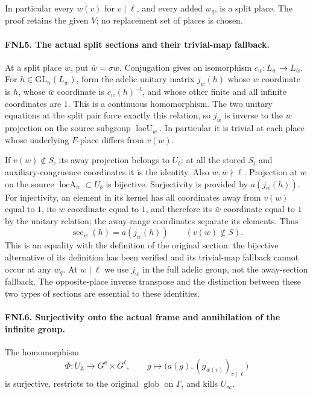 In particular every \(w(v)\) for \(v\mid\ell\), and every added
\(w_q\), is a split place.  The proof retains the given \(V\); no
replacement set of places is chosen.

\paragraph{FNL5. The actual split sections and their trivial-map fallback.}
\label{claim:FNL5}
At a split place \(w\), put \(\bar w=\sigma w\).  Conjugation gives
an isomorphism \(c_w:L_w\to L_{\bar w}\).  For
\(h\in\mathrm{GL}_n(L_w)\), form the adelic unitary matrix \(j_w(h)\)
whose \(w\) coordinate is \(h\), whose \(\bar w\) coordinate is
\(c_w(h)^{-\mathsf t}\), and whose other finite and all infinite
coordinates are \(1\).  This is a continuous homomorphism.  The two
unitary equations at the split pair force exactly this relation, so
\(j_w\) is inverse to the \(w\) projection on the source subgroup
\(\operatorname{locU}_w\).  In particular it is trivial at each
place whose underlying \(F\)-place differs from \(v(w)\).

If \(v(w)\notin S\), its away projection belongs to \(U_b\): at all
the stored \(S_t\) and auxiliary-congruence coordinates it is the
identity.  Also \(w,\bar w\nmid\ell\).  Projection at \(w\) on the
source \(\operatorname{locA}_w\subset U_b\) is bijective.  Surjectivity
is provided by \(a(j_w(h))\).  For injectivity, an element in its
kernel has all coordinates away from \(v(w)\) equal to \(1\), its
\(w\) coordinate equal to \(1\), and therefore its \(\bar w\)
coordinate equal to \(1\) by the unitary relation; the away-range
coordinates separate its elements.  Thus
\[
       \operatorname{sec}_w(h)=a(j_w(h))
          \qquad(v(w)\notin S).
\]
This is an equality with the definition of the original section:
the bijective alternative of its definition has been verified and
its trivial-map fallback cannot occur at any \(w_q\).  At \(w\mid\ell\)
we use \(j_w\) in the full adelic group, not the away-section fallback.
The opposite-place inverse transpose and the distinction between these
two types of sections are essential to these identities.

\paragraph{FNL6. Surjectivity onto the actual frame and annihilation of the infinite group.}
\label{claim:FNL6}
The homomorphism
\[
 \Phi:U_{\mathbb A}\longrightarrow G^a\times G^\ell,
 \qquad g\longmapsto\bigl(a(g),(g_{w(v)})_{v\mid\ell}\bigr)
\]
is surjective, restricts to the original \(\operatorname{glob}\) on
\(\Gamma\), and kills \(U_\infty\).

